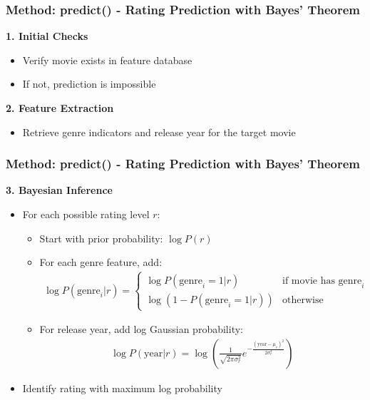 \documentclass{beamer}
\begin{document}
\begin{frame}
\frametitle{Method: predict() - Rating Prediction with Bayes' Theorem}

    \textbf{1. Initial Checks}
    \begin{itemize}
        \item Verify movie exists in feature database
        \item If not, prediction is impossible
    \end{itemize}
    
    \textbf{2. Feature Extraction}
    \begin{itemize}
        \item Retrieve genre indicators and release year for the target movie
    \end{itemize}
\end{frame}

\begin{frame}
\frametitle{Method: predict() - Rating Prediction with Bayes' Theorem}

    \textbf{3. Bayesian Inference}
    \begin{itemize}
        \item For each possible rating level $r$:
        \begin{itemize}
            \item Start with prior probability: $\log P(r)$
            \item For each genre feature, add:
            \begin{align*}
            \log P(\text{genre}_i | r) = 
            \begin{cases} 
            \log P(\text{genre}_i = 1 | r) & \text{if movie has genre}_i \\
            \log(1 - P(\text{genre}_i = 1 | r)) & \text{otherwise}
            \end{cases}
            \end{align*}
            \item For release year, add log Gaussian probability:
            \begin{align*}
            \log P(\text{year} | r) = \log\left(\frac{1}{\sqrt{2\pi\sigma^2_r}} e^{-\frac{(\text{year} - \mu_r)^2}{2\sigma^2_r}}\right)
            \end{align*}
        \end{itemize}
        \item Identify rating with maximum log probability
    \end{itemize}
\end{frame}
\end{document}
